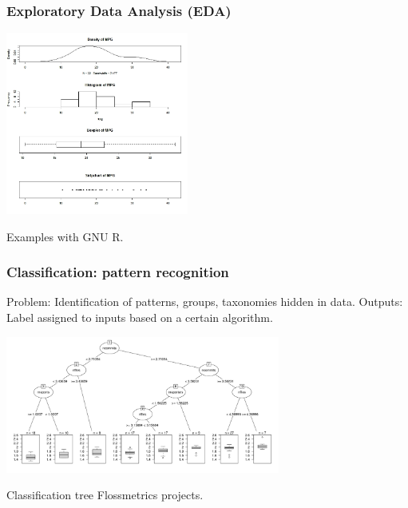\begin{frame}
\frametitle{Exploratory Data Analysis (EDA)}

\begin{center}
 \includegraphics[height=6cm]{figs/simpleplots.jpg}
\end{center}

\begin{flushright}
\small Examples with GNU R.
\end{flushright}

\end{frame}


\begin{frame}
\frametitle{Classification: pattern recognition}

Problem: Identification of patterns, groups, taxonomies hidden in
data. Outputs: Label assigned to inputs based on a certain algorithm.

\begin{center}
 \includegraphics[height=4.5cm]{figs/tree-projects.jpg}
\end{center}

\begin{flushright}
\small Classification tree Flossmetrics projects.
\end{flushright}

\end{frame}

